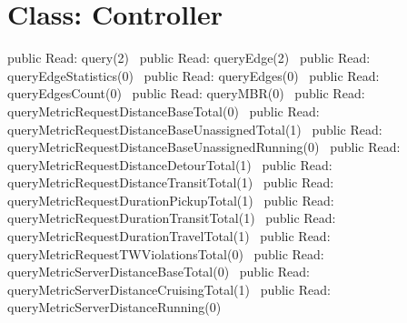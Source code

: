 \section*{Class: Controller}
\nwenddocs{}\endmoddef{}
public \LA{}Read: query(2)~{\nwtagstyle{}}\RA{}
public \LA{}Read: queryEdge(2)~{\nwtagstyle{}}\RA{}
public \LA{}Read: queryEdgeStatistics(0)~{\nwtagstyle{}}\RA{}
public \LA{}Read: queryEdges(0)~{\nwtagstyle{}}\RA{}
public \LA{}Read: queryEdgesCount(0)~{\nwtagstyle{}}\RA{}
public \LA{}Read: queryMBR(0)~{\nwtagstyle{}}\RA{}
public \LA{}Read: queryMetricRequestDistanceBaseTotal(0)~{\nwtagstyle{}}\RA{}
public \LA{}Read: queryMetricRequestDistanceBaseUnassignedTotal(1)~{\nwtagstyle{}}\RA{}
public \LA{}Read: queryMetricRequestDistanceBaseUnassignedRunning(0)~{\nwtagstyle{}}\RA{}
public \LA{}Read: queryMetricRequestDistanceDetourTotal(1)~{\nwtagstyle{}}\RA{}
public \LA{}Read: queryMetricRequestDistanceTransitTotal(1)~{\nwtagstyle{}}\RA{}
public \LA{}Read: queryMetricRequestDurationPickupTotal(1)~{\nwtagstyle{}}\RA{}
public \LA{}Read: queryMetricRequestDurationTransitTotal(1)~{\nwtagstyle{}}\RA{}
public \LA{}Read: queryMetricRequestDurationTravelTotal(1)~{\nwtagstyle{}}\RA{}
public \LA{}Read: queryMetricRequestTWViolationsTotal(0)~{\nwtagstyle{}}\RA{}
public \LA{}Read: queryMetricServerDistanceBaseTotal(0)~{\nwtagstyle{}}\RA{}
public \LA{}Read: queryMetricServerDistanceCruisingTotal(1)~{\nwtagstyle{}}\RA{}
public \LA{}Read: queryMetricServerDistanceRunning(0)~{\nwtagstyle{}}\RA{}
